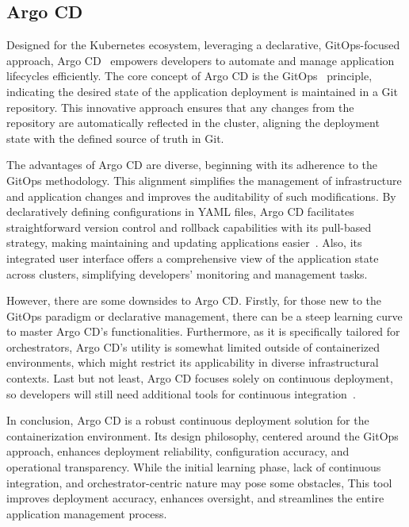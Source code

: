 \subsection{Argo CD}

Designed for the Kubernetes ecosystem, leveraging a declarative, GitOps-focused approach, Argo CD~\parencite{ArgoCDDeclarative} empowers developers to automate and manage application lifecycles efficiently. The core concept of Argo CD is the GitOps~\parencite{WeaveworksWeavegitopsWeave} principle, indicating the desired state of the application deployment is maintained in a Git repository. This innovative approach ensures that any changes from the repository are automatically reflected in the cluster, aligning the deployment state with the defined source of truth in Git. 

The advantages of Argo CD are diverse, beginning with its adherence to the GitOps methodology. This alignment simplifies the management of infrastructure and application changes and improves the auditability of such modifications. By declaratively defining configurations in YAML files, Argo CD facilitates straightforward version control and rollback capabilities with its pull-based strategy, making maintaining and updating applications easier~\parencite{beetzGitOpsEvolutionDevOps2022}. Also, its integrated user interface offers a comprehensive view of the application state across clusters, simplifying developers' monitoring and management tasks. 

However, there are some downsides to Argo CD. Firstly, for those new to the GitOps paradigm or declarative management, there can be a steep learning curve to master Argo CD's functionalities. Furthermore, as it is specifically tailored for orchestrators, Argo CD's utility is somewhat limited outside of containerized environments, which might restrict its applicability in diverse infrastructural contexts. Last but not least, Argo CD focuses solely on continuous deployment, so developers will still need additional tools for continuous integration~\parencite{ramadoniAnalysisUseDeclarative2021}. 

In conclusion, Argo CD is a robust continuous deployment solution for the containerization environment. Its design philosophy, centered around the GitOps approach, enhances deployment reliability, configuration accuracy, and operational transparency. While the initial learning phase, lack of continuous integration, and orchestrator-centric nature may pose some obstacles, This tool improves deployment accuracy, enhances oversight, and streamlines the entire application management process. 


